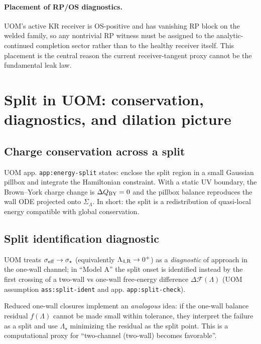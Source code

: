 \documentclass[11pt]{article}
\theoremstyle{definition}
\theoremstyle{plain}
\theoremstyle{remark}
\begin{document}
\paragraph{Placement of RP/OS diagnostics.}
UOM's active KR receiver is OS-positive and has vanishing RP block on the welded family, so any nontrivial RP witness must
be assigned to the analytic-continued completion sector rather than to the healthy receiver itself.
This placement is the central reason the current receiver-tangent proxy cannot be the fundamental leak law.

\section{Split in UOM: conservation, diagnostics, and dilation picture}
\label{sec:uom-split}

\subsection{Charge conservation across a split}
\label{subsec:by-charge-conservation}

UOM app. \texttt{app:energy-split} states: enclose the split region in a small Gaussian pillbox and integrate the
Hamiltonian constraint. With a static UV boundary, the Brown--York charge change is $\Delta Q_{\rm BY}=0$ and the pillbox
balance reproduces the wall ODE projected onto $\Sigma_\Lambda$. In short: the split is a redistribution of quasi-local
energy compatible with global conservation.

\subsection{Split identification diagnostic}
\label{subsec:split-ident}

UOM treats $\sigma_{\rm eff}\to\sigma_\star$ (equivalently $\Lambda_{4,{\rm R}}\to 0^+$) as a \emph{diagnostic}
of approach in the one-wall channel; in ``Model A'' the split onset is identified instead by the first crossing of a
two-wall vs one-wall free-energy difference $\Delta\mathcal F(\Lambda)$ (UOM assumption \texttt{ass:split-ident} and app.
\texttt{app:split-check}).

Reduced one-wall closures implement an \emph{analogous} idea: if the one-wall balance residual $f(\Lambda)$ cannot be made
small within tolerance, they interpret the failure as a split and use $\Lambda_\star$ minimizing the residual as the split
point.
This is a computational proxy for ``two-channel (two-wall) becomes favorable''.
\end{document}
